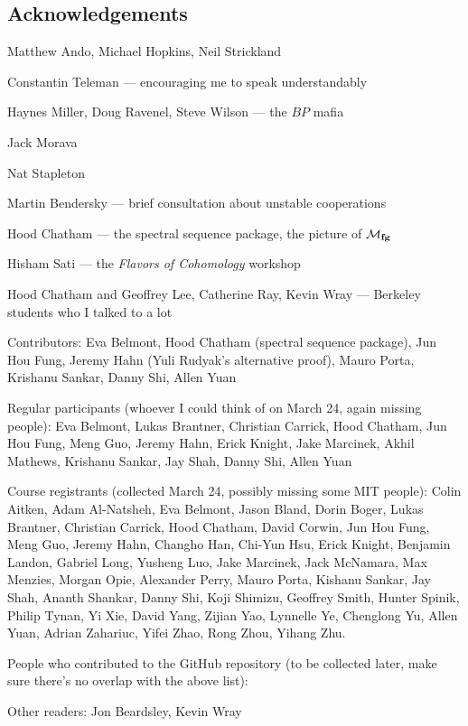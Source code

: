 


\newpage

\subsection*{Acknowledgements}

Matthew Ando, Michael Hopkins, Neil Strickland

Constantin Teleman --- encouraging me to speak understandably

Haynes Miller, Doug Ravenel, Steve Wilson --- the $BP$ mafia

Jack Morava

Nat Stapleton

Martin Bendersky --- brief consultation about unstable cooperations

Hood Chatham --- the spectral sequence package, the picture of $\mathcal{M}_{\mathbf{fg}}$

Hisham Sati --- the \textit{Flavors of Cohomology} workshop

Hood Chatham and Geoffrey Lee, Catherine Ray, Kevin Wray --- Berkeley students who I talked to a lot





Contributors: Eva Belmont, Hood Chatham (spectral sequence package), Jun Hou Fung, Jeremy Hahn (Yuli Rudyak's alternative proof), Mauro Porta, Krishanu Sankar, Danny Shi, Allen Yuan

Regular participants (whoever I could think of on March 24, again missing people): Eva Belmont, Lukas Brantner, Christian Carrick, Hood Chatham, Jun Hou Fung, Meng Guo, Jeremy Hahn, Erick Knight, Jake Marcinek, Akhil Mathews, Krishanu Sankar, Jay Shah, Danny Shi, Allen Yuan

Course registrants (collected March 24, possibly missing some MIT people): Colin Aitken, Adam Al-Natsheh, Eva Belmont, Jason Bland, Dorin Boger, Lukas Brantner, Christian Carrick, Hood Chatham, David Corwin, Jun Hou Fung, Meng Guo, Jeremy Hahn, Changho Han, Chi-Yun Hsu, Erick Knight, Benjamin Landon, Gabriel Long, Yusheng Luo, Jake Marcinek, Jack McNamara, Max Menzies, Morgan Opie, Alexander Perry, Mauro Porta, Kishanu Sankar, Jay Shah, Ananth Shankar, Danny Shi, Koji Shimizu, Geoffrey Smith, Hunter Spinik, Philip Tynan, Yi Xie, David Yang, Zijian Yao, Lynnelle Ye, Chenglong Yu, Allen Yuan, Adrian Zahariuc, Yifei Zhao, Rong Zhou, Yihang Zhu.

People who contributed to the GitHub repository (to be collected later, make sure there's no overlap with the above list): 

Other readers: Jon Beardsley, Kevin Wray

